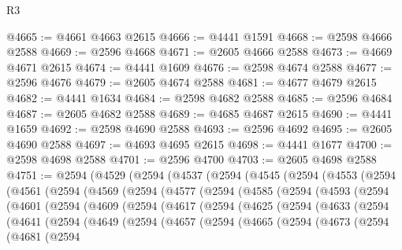 \begin{lexlean}{R3}
\begin{coremodule}
@4665 := @4661 @4663 @2615
@4666 := @4441 @1591
@4668 := @2598 @4666 @2588
@4669 := @2596 @4668
@4671 := @2605 @4666 @2588
@4673 := @4669 @4671 @2615
@4674 := @4441 @1609
@4676 := @2598 @4674 @2588
@4677 := @2596 @4676
@4679 := @2605 @4674 @2588
@4681 := @4677 @4679 @2615
@4682 := @4441 @1634
@4684 := @2598 @4682 @2588
@4685 := @2596 @4684
@4687 := @2605 @4682 @2588
@4689 := @4685 @4687 @2615
@4690 := @4441 @1659
@4692 := @2598 @4690 @2588
@4693 := @2596 @4692
@4695 := @2605 @4690 @2588
@4697 := @4693 @4695 @2615
@4698 := @4441 @1677
@4700 := @2598 @4698 @2588
@4701 := @2596 @4700
@4703 := @2605 @4698 @2588
@4751 := @2594
    (@4529
      (@2594
        (@4537
          (@2594
            (@4545
              (@2594
                (@4553
                  (@2594
                    (@4561
                      (@2594
                        (@4569
                          (@2594
                            (@4577
                              (@2594
                                (@4585
                                  (@2594
                                    (@4593
                                      (@2594
                                        (@4601
                                          (@2594
                                            (@4609
                                              (@2594
                                                (@4617
                                                  (@2594
                                                    (@4625
                                                      (@2594
                                                        (@4633
                                                          (@2594
                                                            (@4641
                                                              (@2594
                                                                (@4649
                                                                  (@2594
                                                                    (@4657
                                                                      (@2594
                                                                        (@4665
                                                                          (@2594
                                                                            (@4673
                                                                              (@2594
                                                                                (@4681
                                                                                  (@2594

\end{coremodule}
\end{lexlean}
